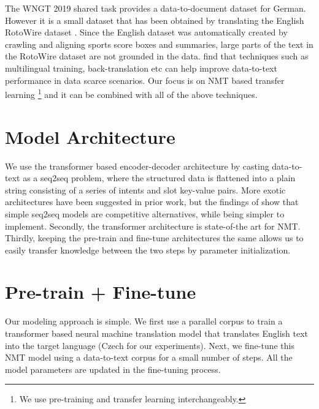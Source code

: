 \documentclass[11pt,a4paper]{article}
\begin{document}
The WNGT 2019 shared task provides a data-to-document dataset for German. However it is a small dataset that has been obtained by translating the English RotoWire dataset \citep{wiseman2017challenges}. Since the English dataset was automatically created by crawling and aligning sports score boxes and summaries,  large parts of the text in the RotoWire dataset are not grounded in the data. \citet{hayashi2019findings} find that techniques such as multilingual training, back-translation etc can help improve data-to-text performance in data scarce scenarios. Our focus is on NMT based transfer learning \footnote{We use pre-training and transfer learning interchangeably.} and it can be combined with all of the above techniques.


\section{Model Architecture}
We use the transformer \citep{vaswani2017attention} based encoder-decoder architecture by casting data-to-text as a seq2seq problem, where the structured data is flattened into a plain string consisting of a series of intents and slot key-value pairs. More exotic architectures have been suggested in prior work, but the findings of \citet{duvsek2018findings} show that simple seq2seq models are competitive alternatives, while being simpler to implement. Secondly, the transformer architecture is state-of-the art for NMT. Thirdly, keeping the pre-train and fine-tune architectures the same allows us to easily transfer knowledge between the two steps by parameter initialization.

\section{Pre-train + Fine-tune}
Our modeling approach is simple. We first use a parallel corpus to train a transformer based neural machine translation model that translates English text into the target language (Czech for our experiments). Next, we fine-tune this NMT model using a data-to-text corpus for a small number of steps. All the model parameters are updated in the fine-tuning process. \par
\end{document}
